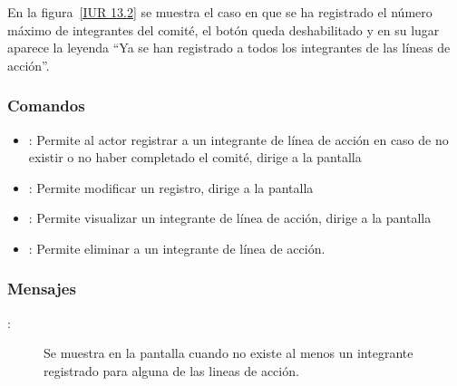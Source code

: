 	
	En la figura~\ref{IUR 13.2} se muestra el caso en que se ha registrado el número máximo de integrantes del comité, el botón  queda deshabilitado y en su lugar aparece la leyenda ``Ya se han registrado a todos los integrantes de las líneas de acción''.



\subsubsection{Comandos}
\begin{itemize}
	\item {}: Permite al actor registrar a un integrante de línea de acción en caso de no existir o no haber completado el comité, dirige a la pantalla 
	\item {}: Permite modificar un registro, dirige a la pantalla  
	\item {}: Permite visualizar un integrante de línea de acción, dirige a la pantalla 
	\item {}: Permite eliminar a un integrante de línea de acción.
\end{itemize}

\subsubsection{Mensajes}

	
\begin{description}
	\item[:] Se muestra en la pantalla  cuando no existe al menos un integrante registrado para alguna de las lineas de acción.
\end{description}
